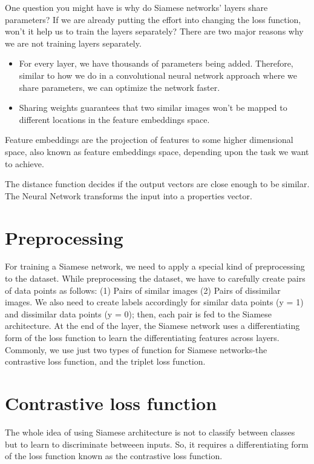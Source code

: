 \documentclass[twoside,twocolumn]{article}
\begin{document}
One question you might have is why do Siamese networks' layers share parameters? If we are already putting the effort into changing the loss function, won't it help us to train the layers separately?
There are two major reasons why we are not training layers separately.
\begin{itemize}
    \item For every layer, we have thousands of parameters being added. Therefore, similar to how we do in a convolutional neural network approach where we share parameters, we can optimize the network faster.
    \item Sharing weights guarantees that two similar images won't be mapped to different locations in the feature embeddings space.
\end{itemize}

Feature embeddings are the projection of features to some higher dimensional space, also known as feature embeddings space, depending upon the task we want to achieve.

The distance function decides if the output vectors are close enough to be similar. The Neural Network transforms the input into a properties vector. 

\section{Preprocessing}
For training a Siamese network, we need to apply a special kind of preprocessing to the dataset. While preprocessing the dataset, we have to carefully create pairs of data points as follows: (1) Pairs of similar images (2) Pairs of dissimilar images.
We also need to create labels accordingly for similar data points (y = 1) and dissimilar data points (y = 0); then, each pair is fed to the Siamese architecture.
At the end of the layer, the Siamese network uses a differentiating form of the loss function to learn the differentiating features across layers.
Commonly, we use just two types of function for Siamese networks-the contrastive loss function, and the triplet loss function.

\section{Contrastive loss function}
The whole idea of using Siamese architecture is not to classify between classes but to learn to discriminate betweeen inputs.
So, it requires a differentiating form of the loss function known as the contrastive loss function. 
\end{document}
